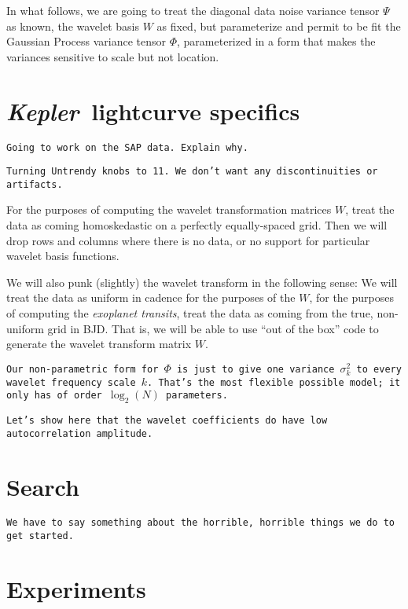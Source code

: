 \documentclass[12pt,letterpaper]{article}
\newcommand{\warning}[1]{\texttt{#1}}
\newcommand{\project}[1]{\textsl{#1}}
\newcommand{\Kepler}{\project{Kepler}}
\newcommand{\variance}{\sigma^2}
\newcommand{\noisetensor}{\Psi}
\newcommand{\wavetensor}{\Phi}
\newcommand{\weightmatrix}{W}
\begin{document}
In what follows,
we are going to treat the diagonal data noise variance tensor $\noisetensor$ as known,
the wavelet basis $\weightmatrix$ as fixed,
but parameterize and permit to be fit the Gaussian Process variance tensor $\wavetensor$,
parameterized in a form that makes the variances sensitive to scale but not location.

\section{\Kepler\ lightcurve specifics}

\warning{Going to work on the SAP data.
         Explain why.}

\warning{Turning Untrendy knobs to 11.
         We don't want any discontinuities or artifacts.}

For the purposes of computing the wavelet transformation matrices $\weightmatrix$,
treat the data as coming homoskedastic on a perfectly equally-spaced grid.
Then we will drop rows and columns where there is no data,
or no support for particular wavelet basis functions.

We will also punk (slightly) the wavelet transform in the following sense:
We will treat the data as uniform in cadence for the purposes
of the $\weightmatrix$, for the purposes of computing the \emph{exoplanet transits},
treat the data as coming from the true, non-uniform grid in BJD.
That is, we will be able to use ``out of the box'' code to generate the wavelet transform
matrix $\weightmatrix$.

\warning{Our non-parametric form for $\wavetensor$ is just to give one variance $\variance_k$
         to every wavelet frequency scale $k$.
         That's the most flexible possible model;
         it only has of order $\log_2(N)$ parameters.}

\warning{Let's show here that the wavelet coefficients do have low autocorrelation amplitude.}

\section{Search}

\warning{We have to say something about the horrible, horrible things we do to get started.}

\section{Experiments}
\end{document}
